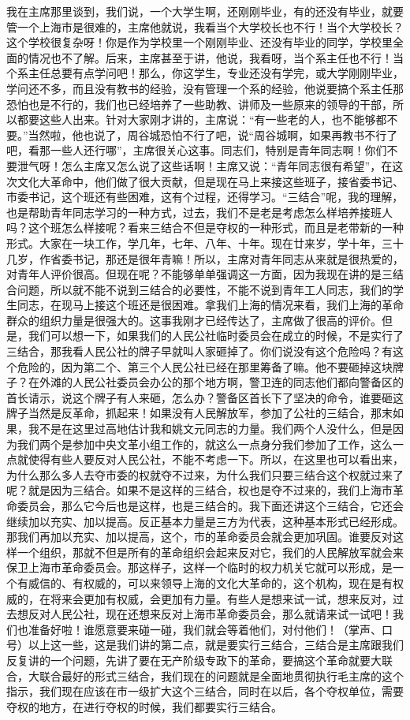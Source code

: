 \begin{maonote}
我在主席那里谈到，我们说，一个大学生啊，还刚刚毕业，有的还没有毕业，就要管一个上海市是很难的，主席他就说，我看当个大学校长也不行！当个大学校长？这个学校很复杂呀！你是作为学校里一个刚刚毕业、还没有毕业的同学，学校里全面的情况也不了解。后来，主席甚至于讲，他说，我看呀，当个系主任也不行！当个系主任总要有点学问吧！那么，你这学生，专业还没有学完，或大学刚刚毕业，学问还不多，而且没有教书的经验，没有管理一个系的经验，他说要搞个系主任那恐怕也是不行的，我们也已经培养了一些助教、讲师及一些原来的领导的干部，所以都要这些人出来。针对大家刚才讲的，主席说：“有一些老的人，也不能够都不要。”当然啦，他也说了，周谷城恐怕不行了吧，说“周谷城啊，如果再教书不行了吧，看那一些人还行哪”，主席很关心这事。同志们，特别是青年同志啊！你们不要泄气呀！怎么主席又怎么说了这些话啊！主席又说：“青年同志很有希望”，在这次文化大革命中，他们做了很大贡献，但是现在马上来接这些班子，接省委书记、市委书记，这个班还有些困难，这有个过程，还得学习。“三结合”呢，我的理解，也是帮助青年同志学习的一种方式，过去，我们不是老是考虑怎么样培养接班人吗？这个班怎么样接呢？看来三结合不但是夺权的一种形式，而且是老带新的一种形式。大家在一块工作，学几年，七年、八年、十年。现在廿来岁，学十年，三十几岁，作省委书记，那还是很年青嘛！所以，主席对青年同志从来就是很热爱的，对青年人评价很高。但现在呢？不能够单单强调这一方面，因为我现在讲的是三结合问题，所以就不能不说到三结合的必要性，不能不说到青年工人同志，我们的学生同志，在现马上接这个班还是很困难。拿我们上海的情况来看，我们上海的革命群众的组织力量是很强大的。这事我刚才已经传达了，主席做了很高的评价。但是，我们可以想一下，如果我们的人民公社临时委员会在成立的时候，不是实行了三结合，那我看人民公社的牌子早就叫人家砸掉了。你们说没有这个危险吗？有这个危险的，因为第二个、第三个人民公社已经在那里筹备了嘛。他不要砸掉这块牌子？在外滩的人民公社委员会办公的那个地方啊，警卫连的同志他们都向警备区的首长请示，说这个牌子有人来砸，怎么办？警备区首长下了坚决的命令，谁要砸这牌子当然是反革命，抓起来！如果没有人民解放军，参加了公社的三结合，那末如果，我不是在这里过高地估计我和姚文元同志的力量。我们两个人没什么，但是因为我们两个是参加中央文革小组工作的，就这么一点身分我们参加了工作，这么一点就使得有些人要反对人民公社，不能不考虑一下。所以，在这里也可以看出来，为什么那么多人去夺市委的权就夺不过来，为什么我们只要三结合这个权就过来了呢？就是因为三结合。如果不是这样的三结合，权也是夺不过来的，我们上海市革命委员会，那么它今后也是这样，也是三结合的。我下面还讲这个三结合，它还会继续加以充实、加以提高。反正基本力量是三方为代表，这种基本形式已经形成。那我们再加以充实、加以提高，这个，市的革命委员会就会更加巩固。谁要反对这样一个组织，那就不但是所有的革命组织会起来反对它，我们的人民解放军就会来保卫上海市革命委员会。那这样子，这样一个临时的权力机关它就可以形成，是一个有威信的、有权威的，可以来领导上海的文化大革命的，这个机构，现在是有权威的，在将来会更加有权威，会更加有力量。有些人是想来试一试，想来反对，过去想反对人民公社，现在还想来反对上海市革命委员会，那么就请来试一试吧！我们也准备好啦！谁愿意要来碰一碰，我们就会等着他们，对付他们！（掌声、口号）以上这一些，这是我们讲的第二点，就是要实行三结合，三结合是主席跟我们反复讲的一个问题，先讲了要在无产阶级专政下的革命，要搞这个革命就要大联合，大联合最好的形式三结合，我们现在的问题就是全面地贯彻执行毛主席的这个指示，我们现在应该在市一级扩大这个三结合，同时在以后，各个夺权单位，需要夺权的地方，在进行夺权的时候，我们都要实行三结合。

\end{maonote}

